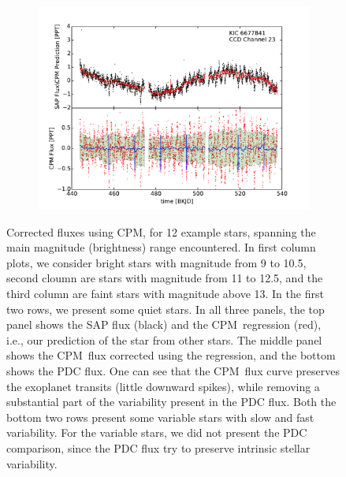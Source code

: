 \documentclass[12pt, preprint]{aastex}
\newcommand{\name}{CPM}
\begin{document}
\begin{figure}[htb]
\begin{subfigure}[htb]{0.33\textwidth}
\end{subfigure}%
\hfill
\begin{subfigure}[htb]{0.33\textwidth}
\includegraphics[width=\textwidth]{kic_6677841}
\end{subfigure}

\caption{
  \label{fluxes} 
  Corrected fluxes using \name, for 12 example stars, 
    spanning the main magnitude (brightness) range encountered. 
  In first column plots, we consider bright stars with magnitude from 9 to 10.5, 
    second cloumn are stars with magnitude from 11 to 12.5,  
    and the third column are faint stars with magnitude above 13. 
  In the first two rows, we present some quiet stars. 
  In all three panels, the top panel shows the SAP flux (black) and the \name\ regression (red), 
    i.e., our prediction of the star from other stars. 
  The middle panel shows the \name\ flux corrected using the regression, and the bottom shows the PDC flux. 
  One can see that the \name\ flux curve preserves the exoplanet transits (little downward spikes), 
    while removing a substantial part of the variability present in the PDC flux. 
  Both the bottom two rows present some variable stars with slow and fast variability. 
  For the variable stars, we did not present the PDC comparison, 
    since the PDC flux try to preserve intrinsic stellar variability.}
\end{figure}
\end{document}
